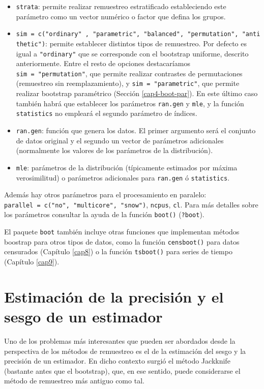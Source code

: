 \documentclass[]{book}
\theoremstyle{definition}
\theoremstyle{definition}
\theoremstyle{definition}
\theoremstyle{remark}
\begin{document}
\begin{itemize}
\item
  \texttt{strata}: permite realizar remuestreo estratificado
  estableciendo este parámetro como un vector numérico o factor que
  defina los grupos.
\item
  \texttt{sim\ =\ c("ordinary"\ ,\ "parametric",\ "balanced",\ "permutation",\ "antithetic")}:
  permite establecer distintos tipos de remuestreo. Por defecto es igual
  a \texttt{"ordinary"} que se corresponde con el bootstrap uniforme,
  descrito anteriormente. Entre el resto de opciones destacaríamos
  \texttt{sim\ =\ "permutation"}, que permite realizar contrastes de
  permutaciones (remuestreo sin reemplazamiento), y
  \texttt{sim\ =\ "parametric"}, que permite realizar bootstrap
  paramétrico (Sección \ref{cap4-boot-par}). En este último caso también
  habrá que establecer los parámetros \texttt{ran.gen} y \texttt{mle}, y
  la función \texttt{statistics} no empleará el segundo parámetro de
  índices.
\item
  \texttt{ran.gen}: función que genera los datos. El primer argumento
  será el conjunto de datos original y el segundo un vector de
  parámetros adicionales (normalmente los valores de los parámetros de
  la distribución).
\item
  \texttt{mle}: parámetros de la distribución (típicamente estimados por
  máxima verosimilitud) o parámetros adicionales para \texttt{ran.gen} ó
  \texttt{statistics}.
\end{itemize}

Además hay otros parámetros para el procesamiento en paralelo:
\texttt{parallel\ =\ c("no",\ "multicore",\ "snow")}, \texttt{ncpus},
\texttt{cl}. Para más detalles sobre los parámetros consultar la ayuda
de la función \texttt{boot()} (\texttt{?boot}).

El paquete \texttt{boot} también incluye otras funciones que implementan
métodos boostrap para otros tipos de datos, como la función
\texttt{censboot()} para datos censurados (Capítulo \ref{cap8}) o la
función \texttt{tsboot()} para series de tiempo (Capítulo \ref{cap9}).

\chapter{Estimación de la precisión y el sesgo de un
estimador}\label{cap2}

Uno de los problemas más interesantes que pueden ser abordados desde la
perspectiva de los métodos de remuestreo es el de la estimación del
sesgo y la precisión de un estimador. En dicho contexto surgió el método
Jackknife (bastante antes que el bootstrap), que, en ese sentido, puede
considerarse el método de remuestreo más antiguo como tal.
\end{document}
